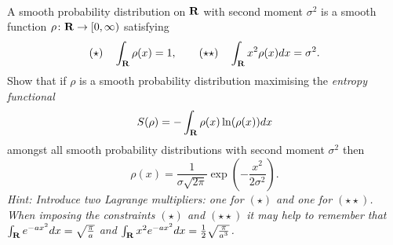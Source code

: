 \documentclass[12pt]{article}
\begin{document}
\iffalse
\begin{answer}
The Euler-Lagrange equation is $\dd{}{x}\left(P'(y')\right)=0$ so $P'(y')=C$ for some constant $C$.

\mks{2}

Therefore $y'$ is a zero of the polynomial $P'-C$.

\mks{1}

Since polynomials have a finite number of zeros, $y'\equiv A$ for one of the zeros $P'(A)-C=0$, so $y(x)=Ax+B$ (note that since the polynomial has even degree, $P'-C$ has at least one zero). The boundary conditions now imply that $A=1$, $B=0$ (hence $C=P'(1)$) and so $y(x)=x$ is the only solution.

\mks{2}
\end{answer}
\newpage
\fi

\bigskip

\begin{question}\ \\
A smooth probability distribution on $\RR$ with second moment $\sigma^2$ is a smooth function $\rho\colon\mathbf{R}\to[0,\infty)$ satisfying
\[(\star)\quad \int_{\mathbf{R}}\rho(x)=1,\qquad (\star\star)\quad\int_{\mathbf{R}}x^2\rho(x)dx=\sigma^2.\]
Show that if $\rho$ is a smooth probability distribution maximising the {\em entropy functional}
\[S(\rho)=-\int_{\mathbf{R}}\rho(x)\ln(\rho(x))dx\]
amongst all smooth probability distributions with second moment $\sigma^2$ then
\[\rho(x)=\frac{1}{\sigma\sqrt{2\pi}}\exp\left(-\frac{x^2}{2\sigma^2}\right).\]
{\em Hint: Introduce two Lagrange multipliers: one for $(\star)$ and one for $(\star\star)$. When imposing the constraints $(\star)$ and $(\star\star)$ it may help to remember that $\int_{\mathbf{R}}e^{-ax^2}dx=\sqrt{\frac{\pi}{a}}$ and $\int_{\mathbf{R}}x^2e^{-ax^2}dx=\frac{1}{2}\sqrt{\frac{\pi}{a^3}}$.}
\end{question}

\iffalse
\begin{answer}
We need to introduce the modified functional with two Lagrange multipliers
\[\int_{\RR}\left(-\rho\ln\rho-\lambda_1(\rho-\kappa)-\lambda_2(x^2\rho-\kappa)\right)dx\]
where $\kappa$ is an arbitrary function with $\int_{\RR}\kappa dx=1$ (over a finite interval of length $L$ we could just use $\kappa=1/L$, but this doesn't work for the whole real line!). The Euler-Lagrange equation is
\[-\ln\rho-1-\lambda_1-\lambda_2x^2=0\]
because there is no $\rho'$-dependence. This implies
\[\rho=\exp(-1-\lambda_1)\exp(-\lambda_2x^2)\]
so this is a normal distribution with mean zero. Let's call $\exp(-1-\lambda_1)=A$. The integral of this distribution over $\RR$ is $A\sqrt{\pi/\lambda_2}$ and the second moment is $\tfrac{1}{2}A\sqrt{\pi/\lambda_2^3}$. This gives $\lambda_2=1/2\sigma^2$ and $A=1/\sigma\sqrt{2\pi}$.
\end{answer}
\newpage
\fi
\end{document}
